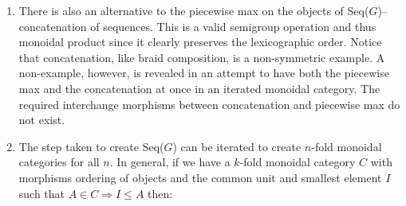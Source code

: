 \documentclass{tac}
\begin{document}
{\begin{enumerate}
 $
   a \le max(a,c) \text{ and } b \le max(b,d)  \text{ so } $
   
              $  ab \le max(a,c)max(b,d)   \text{ and similarly } $
                
              $  cd \le max(a,c)max(b,d).
$
 
 The internal and external unit and associativity conditions of Definition~\ref{iterated} are all satisfied due to the
 fact that there is only one morphism between two objects. 
  Besides Seq($G$) examples
 of such semigroups as in Theorem~\ref{semi} are the nonnegative integers under addition
 and the braids on $n$ strands with only right-handed crossings. Further examples are found in the papers on
 semirings and idempotent mathematics, such as \cite{LitSob} and its references as well as on
 the related concept of tropical mathematics, such as \cite{Sturm} and its references. Semirings that arise in these
 two areas of study usually require some 
 translation to yield 2-fold monoidal categories since they typically have a zero and a unity, $0 \ne 1.$ 
 \item
 There is also an alternative
 to the piecewise max on the objects of Seq($G$)-- concatenation of sequences. This is a valid semigroup
 operation and thus monoidal product since it clearly preserves the lexicographic order.
 Notice that concatenation, like braid composition, is a non-symmetric example. A non-example,
 however, is revealed in an attempt to have both the piecewise max and the concatenation at once in
 an iterated monoidal category. The required interchange morphisms between
 concatenation and piecewise max do not exist. 
 \item
 The step taken to create Seq($G$) can be iterated to create $n$-fold monoidal categories for all $n.$ 
 In general, if we have a $k$-fold monoidal category $C$ with morphisms ordering of objects and the
common unit and smallest element $I$ such that $A\in C \Rightarrow I\le A$ then:


\end{enumerate}}
\end{document}

